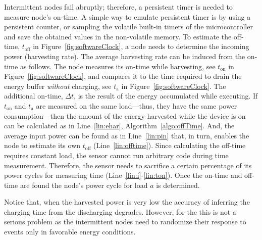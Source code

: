 Intermittent nodes fail abruptly; therefore, a persistent timer is needed to measure node's on-time. A simple way to emulate persistent timer is by using a persistent counter, or sampling the volatile built-in timers of the microcontroller and save the obtained values in the non-volatile memory. To estimate the off-time, $t_\text{off}$ in Figure~\ref{fig:softwareClock}, a node needs to determine the incoming power (harvesting rate). The average harvesting rate can be induced from the on-time as follows.
%
The node measures its on-time while harvesting, see $t_\text{on}$ in Figure~\ref{fig:softwareClock}, and compares it to the time required to drain the energy buffer \emph{without} charging, see $t_\text{a}$ in Figure~\ref{fig:softwareClock}. The additional on-time, $\Delta t$, is the result of the energy accumulated while executing. 
%
If $t_\text{on}$ and $t_\text{a}$ are measured on the same load---thus, they have the same power consumption---then the amount of the energy harvested while the device is on can be calculated as in Line~\ref{lin:ehar}, Algorithm~\ref{algo:offTime}. And, the average input power can be found as in Line~\ref{lin:pin} that, in turn, enables the node to estimate its own $t_\text{off}$ (Line~\ref{lin:offtime}).
Since calculating the off-time requires constant load, the sensor cannot run arbitrary code during time measurement. Therefore, the sensor needs to sacrifice a certain percentage of its power cycles for measuring time (Line~\ref{lin:i}-\ref{lin:ton}). Once the on-time and off-time are found the node's power cycle for load $a$ is determined.

Notice that, when the harvested power is very low the accuracy of inferring the charging time from the discharging degrades. However, for the \fullcis this is not a serious problem as the intermittent nodes need to randomize their response to events only in favorable energy conditions. 

